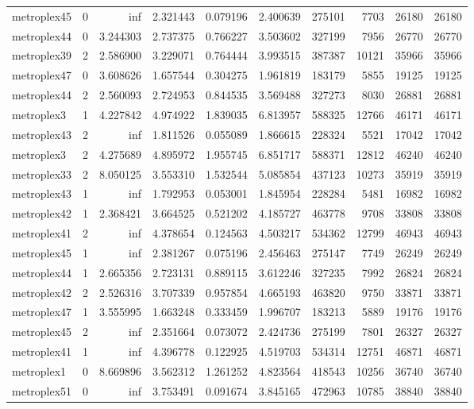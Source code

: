 \begin{longtable}{|l|r|r|r|r|r|r|r|r|r|}
metroplex45 & 0 & inf & 2.321443 & 0.079196 & 2.400639 & 275101 & 7703 & 26180 & 26180 \\
metroplex44 & 0 & 3.244303 & 2.737375 & 0.766227 & 3.503602 & 327199 & 7956 & 26770 & 26770 \\
metroplex39 & 2 & 2.586900 & 3.229071 & 0.764444 & 3.993515 & 387387 & 10121 & 35966 & 35966 \\
metroplex47 & 0 & 3.608626 & 1.657544 & 0.304275 & 1.961819 & 183179 & 5855 & 19125 & 19125 \\
metroplex44 & 2 & 2.560093 & 2.724953 & 0.844535 & 3.569488 & 327273 & 8030 & 26881 & 26881 \\
metroplex3 & 1 & 4.227842 & 4.974922 & 1.839035 & 6.813957 & 588325 & 12766 & 46171 & 46171 \\
metroplex43 & 2 & inf & 1.811526 & 0.055089 & 1.866615 & 228324 & 5521 & 17042 & 17042 \\
metroplex3 & 2 & 4.275689 & 4.895972 & 1.955745 & 6.851717 & 588371 & 12812 & 46240 & 46240 \\
metroplex33 & 2 & 8.050125 & 3.553310 & 1.532544 & 5.085854 & 437123 & 10273 & 35919 & 35919 \\
metroplex43 & 1 & inf & 1.792953 & 0.053001 & 1.845954 & 228284 & 5481 & 16982 & 16982 \\
metroplex42 & 1 & 2.368421 & 3.664525 & 0.521202 & 4.185727 & 463778 & 9708 & 33808 & 33808 \\
metroplex41 & 2 & inf & 4.378654 & 0.124563 & 4.503217 & 534362 & 12799 & 46943 & 46943 \\
metroplex45 & 1 & inf & 2.381267 & 0.075196 & 2.456463 & 275147 & 7749 & 26249 & 26249 \\
metroplex44 & 1 & 2.665356 & 2.723131 & 0.889115 & 3.612246 & 327235 & 7992 & 26824 & 26824 \\
metroplex42 & 2 & 2.526316 & 3.707339 & 0.957854 & 4.665193 & 463820 & 9750 & 33871 & 33871 \\
metroplex47 & 1 & 3.555995 & 1.663248 & 0.333459 & 1.996707 & 183213 & 5889 & 19176 & 19176 \\
metroplex45 & 2 & inf & 2.351664 & 0.073072 & 2.424736 & 275199 & 7801 & 26327 & 26327 \\
metroplex41 & 1 & inf & 4.396778 & 0.122925 & 4.519703 & 534314 & 12751 & 46871 & 46871 \\
metroplex1 & 0 & 8.669896 & 3.562312 & 1.261252 & 4.823564 & 418543 & 10256 & 36740 & 36740 \\
metroplex51 & 0 & inf & 3.753491 & 0.091674 & 3.845165 & 472963 & 10785 & 38840 & 38840 \\

\end{longtable}
